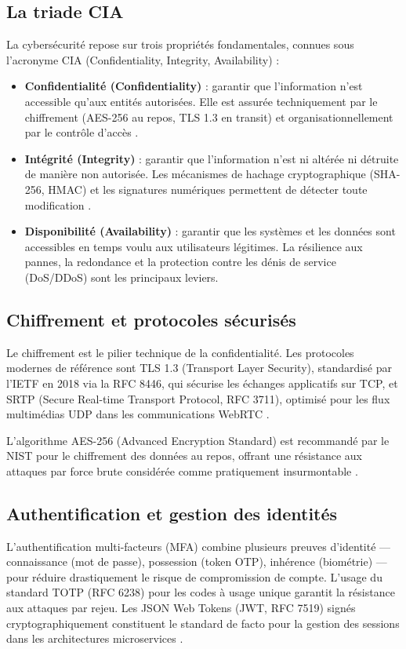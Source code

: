 \subsection{La triade CIA}
La cybersécurité repose sur trois propriétés fondamentales, connues sous l'acronyme CIA (Confidentiality, Integrity, Availability) :
\begin{itemize}
    \item \textbf{Confidentialité (Confidentiality)} : garantir que l'information n'est accessible qu'aux entités autorisées. Elle est assurée techniquement par le chiffrement (AES-256 au repos, TLS 1.3 en transit) et organisationnellement par le contrôle d'accès \cite{cryptography}.
    \item \textbf{Intégrité (Integrity)} : garantir que l'information n'est ni altérée ni détruite de manière non autorisée. Les mécanismes de hachage cryptographique (SHA-256, HMAC) et les signatures numériques permettent de détecter toute modification \cite{cryptography}.
    \item \textbf{Disponibilité (Availability)} : garantir que les systèmes et les données sont accessibles en temps voulu aux utilisateurs légitimes. La résilience aux pannes, la redondance et la protection contre les dénis de service (DoS/DDoS) sont les principaux leviers.
\end{itemize}

\subsection{Chiffrement et protocoles sécurisés}
Le chiffrement est le pilier technique de la confidentialité. Les protocoles modernes de référence sont TLS 1.3 (Transport Layer Security), standardisé par l'IETF en 2018 via la RFC 8446, qui sécurise les échanges applicatifs sur TCP, et SRTP (Secure Real-time Transport Protocol, RFC 3711), optimisé pour les flux multimédias UDP dans les communications WebRTC \cite{webrtc}.

L'algorithme AES-256 (Advanced Encryption Standard) est recommandé par le NIST pour le chiffrement des données au repos, offrant une résistance aux attaques par force brute considérée comme pratiquement insurmontable \cite{nist}.

\subsection{Authentification et gestion des identités}
L'authentification multi-facteurs (MFA) combine plusieurs preuves d'identité — connaissance (mot de passe), possession (token OTP), inhérence (biométrie) — pour réduire drastiquement le risque de compromission de compte. L'usage du standard TOTP (RFC 6238) pour les codes à usage unique garantit la résistance aux attaques par rejeu. Les JSON Web Tokens (JWT, RFC 7519) signés cryptographiquement constituent le standard de facto pour la gestion des sessions dans les architectures microservices \cite{cryptography}.


